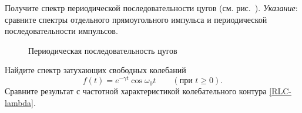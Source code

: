 \begin{lab:exercise}
Получите спектр периодической последовательности цугов (см. рис.~).
\emph{Указание}: сравните спектры отдельного прямоугольного импульса и 
периодической последовательности импульсов.
\end{lab:exercise}

\begin{figure}[h!]
 \centering
    \caption{Периодическая последовательность цугов}
\end{figure}

\begin{lab:exercise}
   Найдите спектр затухающих свободных колебаний
    \begin{equation*}
    f(t) = e^{-\gamma t} \cos \omega_0 t\qquad (\text{при~}t\ge 0).
    \end{equation*}
Сравните результат 
с частотной характеристикой колебательного контура \eqref{RLC-lambda}.
\end{lab:exercise}

%




